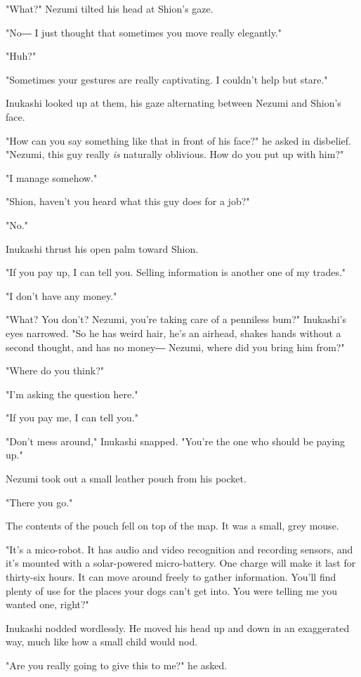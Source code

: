 "What?" Nezumi tilted his head at Shion's gaze.

"No― I just thought that sometimes you move really elegantly."

"Huh?"

"Sometimes your gestures are really captivating. I couldn't help but
stare."

Inukashi looked up at them, his gaze alternating between Nezumi and
Shion's face.

"How can you say something like that in front of his face?" he asked in
disbelief. "Nezumi, this guy really \emph{is} naturally oblivious. How do you
put up with him?"

"I manage somehow."

"Shion, haven't you heard what this guy does for a job?"

"No."

Inukashi thrust his open palm toward Shion.

"If you pay up, I can tell you. Selling information is another one of my
trades."

"I don't have any money."

"What? You don't? Nezumi, you're taking care of a penniless bum?"
Inukashi's eyes narrowed. "So he has weird hair, he's an airhead, shakes
hands without a second thought, and has no money― Nezumi, where did you
bring him from?"

"Where do you think?"

"I'm asking the question here."

"If you pay me, I can tell you."

"Don't mess around," Inukashi snapped. "You're the one who should be
paying up."

Nezumi took out a small leather pouch from his pocket.

"There you go."

The contents of the pouch fell on top of the map. It was a small, grey
mouse.

"It's a mico-robot. It has audio and video recognition and recording
sensors, and it's mounted with a solar-powered micro-battery. One charge
will make it last for thirty-six hours. It can move around freely to
gather information. You'll find plenty of use for the places your dogs
can't get into. You were telling me you wanted one, right?"

Inukashi nodded wordlessly. He moved his head up and down in an
exaggerated way, much like how a small child would nod.

"Are you really going to give this to me?" he asked.

